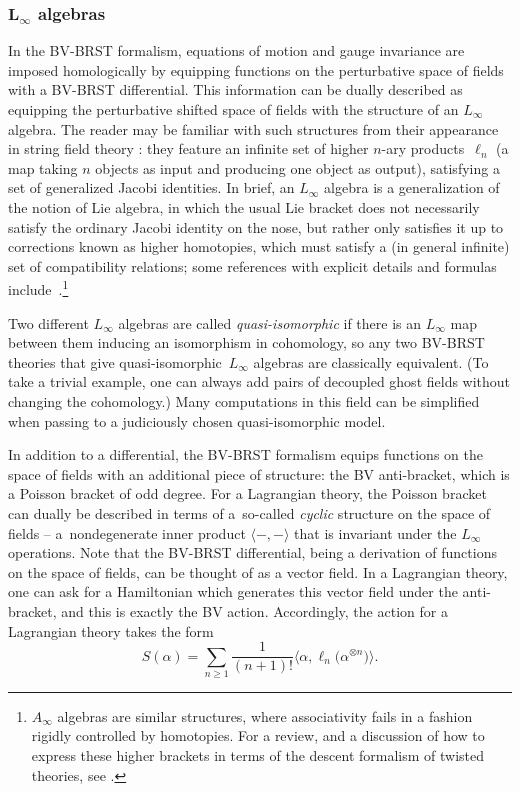 \documentclass[pdftex]{sigma}
\numberwithin{equation}{section}
\theoremstyle{definition}
\begin{document}
\subsubsection[L\_infty algebras]{$\boldsymbol{ L_{\infty}}$ algebras}
In the BV-BRST formalism, equations of motion and gauge invariance are imposed homologically by equipping functions on the perturbative space of fields with a BV-BRST differential. This information can be dually described as equipping the perturbative shifted space of fields with the structure of an $L_\infty$ algebra. The reader may be familiar with such structures from their appearance in string field theory \cite{Gaberdiel:1997ia,Zwiebach:1992ie}: they feature an infinite set of higher $n$-ary products~$\ell_n$ (a map taking $n$ objects as input and producing one object as output), satisfying a set of generalized Jacobi identities. In brief, an $L_{\infty}$ algebra is a generalization of the notion of Lie algebra, in which the usual Lie bracket does not necessarily satisfy the ordinary Jacobi identity on the nose, but rather only satisfies it up to corrections known as higher homotopies, which must satisfy a (in general infinite) set of compatibility relations; some references with explicit details and formulas include~\cite{Jurco:2020yyu,Jurco:2018sby}.\footnote{$A_{\infty}$ algebras are similar structures, where associativity fails in a fashion rigidly controlled by homotopies. For a review, and a discussion of how to express these higher brackets in terms of the descent formalism of twisted theories, see \cite{Garner:2022its}.}

Two different $L_{\infty}$ algebras are called \textit{quasi-isomorphic} if there is an $L_\infty$ map between them inducing an isomorphism in cohomology, so any two BV-BRST theories that give quasi-isomorphic~$L_{\infty}$ algebras are classically equivalent. (To take a trivial example, one can always add pairs of decoupled ghost fields without changing the cohomology.) Many computations in this field can be simplified when passing to a judiciously chosen quasi-isomorphic model.

In addition to a differential, the BV-BRST formalism equips functions on the space of fields with an additional piece of structure: the BV anti-bracket, which is a Poisson bracket of odd degree. For a Lagrangian theory, the Poisson bracket can dually be described in terms of a~so-called \textit{cyclic} structure on the space of fields -- a~nondegenerate inner product $\langle -, - \rangle$ that is invariant under the $L_\infty$ operations. Note that the BV-BRST differential, being a derivation of functions on the space of fields, can be thought of as a vector field. In a Lagrangian theory, one can ask for a Hamiltonian which generates this vector field under the anti-bracket, and this is exactly the BV action. Accordingly, the action for a Lagrangian theory takes the form
\begin{equation}\label{BV action}
S(\alpha) = \sum_{n\geq 1} \frac{1}{(n+1)!} \big\langle \alpha, \ell_n \big(\alpha^{\otimes n}\big) \big\rangle.
\end{equation}
\end{document}
